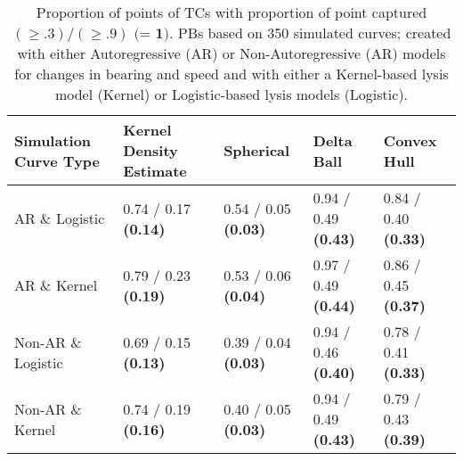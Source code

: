 \begin{table}[ht!]
\centering
\begin{tabular}{|R{1.2in}||L{.95in}L{.95in}|L{.95in}L{.95in}|}
  \hline
Simulation Curve Type & Kernel Density Estimate & Spherical & Delta Ball & Convex Hull \\ 
  \hline
AR \& Logistic & 0.74 / 0.17 \textbf{(0.14)} & 0.54 / 0.05 \textbf{(0.03)} & 0.94 / 0.49 \textbf{(0.43)} & 0.84 / 0.40 \textbf{(0.33)} \\ 
  AR \& Kernel & 0.79 / 0.23 \textbf{(0.19)} & 0.53 / 0.06 \textbf{(0.04)} & 0.97 / 0.49 \textbf{(0.44)} & 0.86 / 0.45 \textbf{(0.37)} \\ 
  Non-AR \& Logistic & 0.69 / 0.15 \textbf{(0.13)} & 0.39 / 0.04 \textbf{(0.03)} & 0.94 / 0.46 \textbf{(0.40)} & 0.78 / 0.41 \textbf{(0.33)} \\ 
  Non-AR \& Kernel & 0.74 / 0.19 \textbf{(0.16)} & 0.40 / 0.05 \textbf{(0.03)} & 0.94 / 0.49 \textbf{(0.43)} & 0.79 / 0.43 \textbf{(0.39)} \\ 
   \hline
\end{tabular}
\caption{Proportion of points of TCs with proportion of point captured  \((\geq .3) / (\geq .9)\) \(\textbf{(= 1)}\). PBs based on 350 simulated curves; created with either Autoregressive (AR) or Non-Autoregressive (AR) models for changes in bearing and speed and with either a Kernel-based lysis model (Kernel) or Logistic-based lysis models (Logistic).} 
\label{tab:prop_captured}
\end{table}
